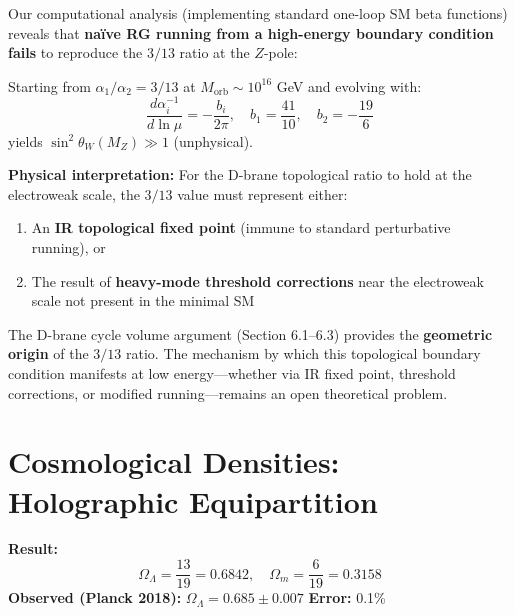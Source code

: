 \documentclass[12pt,a4paper]{article}
\newcommand{\OmegaL}{\Omega_\Lambda}
\newcommand{\OmegaM}{\Omega_m}
\newcommand{\sinW}{\sin^2\theta_W}
\begin{document}
\begin{tcolorbox}[colback=yellow!10!white, colframe=orange!75!black, title=Epistemic Caveat: RG Flow Analysis]
Our computational analysis (implementing standard one-loop SM beta functions) reveals that \textbf{na\"ive RG running from a high-energy boundary condition fails} to reproduce the $3/13$ ratio at the $Z$-pole:

Starting from $\alpha_1/\alpha_2 = 3/13$ at $M_{\text{orb}} \sim 10^{16}$ GeV and evolving with:
\begin{equation}
\frac{d\alpha_i^{-1}}{d\ln\mu} = -\frac{b_i}{2\pi}, \quad b_1 = \frac{41}{10}, \quad b_2 = -\frac{19}{6}
\end{equation}
yields $\sinW(M_Z) \gg 1$ (unphysical).

\textbf{Physical interpretation:} For the D-brane topological ratio to hold at the electroweak scale, the $3/13$ value must represent either:
\begin{enumerate}
    \item An \textbf{IR topological fixed point} (immune to standard perturbative running), or
    \item The result of \textbf{heavy-mode threshold corrections} near the electroweak scale not present in the minimal SM
\end{enumerate}

The D-brane cycle volume argument (Section 6.1--6.3) provides the \textbf{geometric origin} of the $3/13$ ratio. The mechanism by which this topological boundary condition manifests at low energy---whether via IR fixed point, threshold corrections, or modified running---remains an open theoretical problem.
\end{tcolorbox}

\section{Cosmological Densities: Holographic Equipartition}
\label{sec:cosmo}

\begin{derivedbox}
\textbf{Result:}
\begin{equation}
\OmegaL = \frac{13}{19} = 0.6842, \quad \OmegaM = \frac{6}{19} = 0.3158
\end{equation}
\textbf{Observed (Planck 2018):} $\OmegaL = 0.685 \pm 0.007$ \quad \textbf{Error:} 0.1\%
\end{derivedbox}
\end{document}
